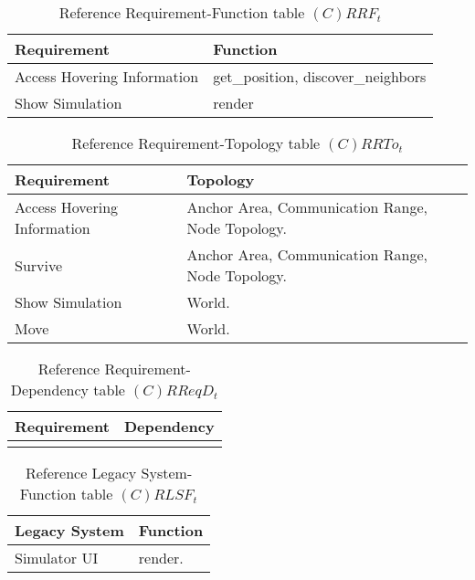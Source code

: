 \begin{table}[H]
	\centering
	\begin{tabular}{|p{4cm}|p{8cm}|}
			\hline
			\textbf{Requirement} & \textbf{Function} \\
			\hline
			Access Hovering Information & get\_position, discover\_neighbors \\
			\hline
			Show Simulation & render \\
			\hline
		\end{tabular}
	\caption{Reference Requirement-Function table $(C)RRF_t$}
	\label{tab:crrft}
\end{table}

\begin{table}[H]
	\centering
	\begin{tabular}{|p{4cm}|p{8cm}|}
			\hline
			\textbf{Requirement} & \textbf{Topology} \\
			\hline
			Access Hovering Information & Anchor Area, Communication Range, Node Topology. \\
			\hline
			Survive & Anchor Area, Communication Range, Node Topology. \\
			\hline
			Show Simulation & World. \\
			\hline
			Move & World. \\
			\hline
		\end{tabular}
	\caption{Reference Requirement-Topology table $(C)RRTo_t$}
	\label{tab:crrtot}
\end{table}

\begin{table}[H]
	\centering
	\begin{tabular}{|p{4cm}|p{8cm}|}
			\hline
			\textbf{Requirement} & \textbf{Dependency} \\
			\hline
			& \\
			\hline
		\end{tabular}
		\caption{Reference Requirement-Dependency table $(C)RReqD_t$}
	\label{tab:crreqdt}
\end{table}

\begin{table}[H]
	\centering
	\begin{tabular}{|p{4cm}|p{8cm}|}
			\hline
			\textbf{Legacy System} & \textbf{Function} \\
			\hline
			Simulator UI & render. \\
			\hline
		\end{tabular}
	\caption{Reference Legacy System-Function table $(C)RLSF_t$}
	\label{tab:crlsft}
\end{table}

